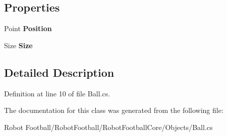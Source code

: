 \subsection*{Properties}
\begin{DoxyCompactItemize}
\item 
\hypertarget{class_robot_football_core_1_1_objects_1_1_ball_af8f5253e21f8d1eacebb9c5892c2feff}{Point {\bfseries Position}}\label{class_robot_football_core_1_1_objects_1_1_ball_af8f5253e21f8d1eacebb9c5892c2feff}

\item 
\hypertarget{class_robot_football_core_1_1_objects_1_1_ball_a6aea7409921ecf2ea4caf8f05efb365c}{Size {\bfseries Size}}\label{class_robot_football_core_1_1_objects_1_1_ball_a6aea7409921ecf2ea4caf8f05efb365c}

\end{DoxyCompactItemize}


\subsection{Detailed Description}


Definition at line 10 of file Ball.\-cs.



The documentation for this class was generated from the following file\-:\begin{DoxyCompactItemize}
\item 
Robot Football/\-Robot\-Football/\-Robot\-Football\-Core/\-Objects/Ball.\-cs\end{DoxyCompactItemize}

